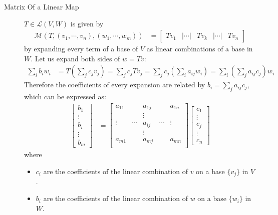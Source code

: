\documentclass[11pt,notitlepage,oneside]{article}
\begin{document}
\begin{description}
\begin{itemize}
  \end{itemize}
  \item[Matrix Of a Linear Map\label{itm:D6_matrix}]  $T\in\mathcal{L}(V,W)$ is given by \begin{align*}
  \mathcal{M}(T, (v_1,\cdots, v_n), (w_1, \cdots, w_m)) &=\begin{bmatrix}
  Tv_1 &| \cdots |& Tv_k & |\cdots |& Tv_n 
  \end{bmatrix} 
  \end{align*} by expanding every term of a base of $V$ as linear combinations of a base in $W$. Let us expand both sides of $w = Tv$:
  \begin{align*}
  \sum_i b_i w_i &= T\left(\sum_j c_jv_j\right) = \sum_j c_j T v_j = \sum_j c_j \left(\sum_i a_{ij} w_i\right) = \sum_i \left( \sum_j  a_{ij} c_j\right) w_i 
  \end{align*}
  Therefore the coefficients of every expansion are related by $b_i = \sum_j  a_{ij} c_j$, which can be expressed as:
  \begin{align*}
  \begin{bmatrix}
  b_1 \\
  \vdots \\
  b_i \\
  \vdots \\
  b_m
  \end{bmatrix}
  &= \begin{bmatrix}
  a_{11} &       &a_{1j} &        & a_{1n} \\
         &       &\vdots &        &        \\
  \vdots &\cdots &a_{ij} & \cdots &\vdots  \\
         &       &\vdots &        &        \\
  a_{m1} &       &a_{mj} &        &a_{mn}  \\
  \end{bmatrix}
  \begin{bmatrix}
  c_1 \\
  \vdots \\
  c_j \\
  \vdots \\
  c_n
  \end{bmatrix}
  \end{align*} where
  \begin{itemize}
  \item $c_i$ are the coefficients of the linear combination of $v$ on a base $\{v_j\}$ in $V$.
  \item $b_i$ are the coefficients of the linear combination of $w$ on a base $\{w_i\}$ in $W$.

\end{itemize}
\end{description}
\end{document}

